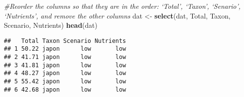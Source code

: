 \documentclass[
]{article}
\newenvironment{Shaded}{\begin{snugshade}}{\end{snugshade}}
\newcommand{\CommentTok}[1]{\textcolor[rgb]{0.56,0.35,0.01}{\textit{#1}}}
\newcommand{\DecValTok}[1]{\textcolor[rgb]{0.00,0.00,0.81}{#1}}
\newcommand{\KeywordTok}[1]{\textcolor[rgb]{0.13,0.29,0.53}{\textbf{#1}}}
\newcommand{\NormalTok}[1]{#1}
\newcommand{\OperatorTok}[1]{\textcolor[rgb]{0.81,0.36,0.00}{\textbf{#1}}}
\newcommand{\StringTok}[1]{\textcolor[rgb]{0.31,0.60,0.02}{#1}}
\begin{document}
\begin{Shaded}
\begin{Highlighting}[]
\CommentTok{#Reorder the columns so that they are in the order: ‘Total’, ‘Taxon’, ‘Senario’, ‘Nutrients’, and remove the other columns}
\NormalTok{dat <-}\StringTok{ }\KeywordTok{select}\NormalTok{(dat, Total, Taxon, Scenario, Nutrients)}
\KeywordTok{head}\NormalTok{(dat)}
\end{Highlighting}
\end{Shaded}

\begin{verbatim}
##   Total Taxon Scenario Nutrients
## 1 50.22 japon      low       low
## 2 41.71 japon      low       low
## 3 41.81 japon      low       low
## 4 48.27 japon      low       low
## 5 55.42 japon      low       low
## 6 42.68 japon      low       low
\end{verbatim}

\begin{Shaded}
\end{Shaded}
\end{document}
